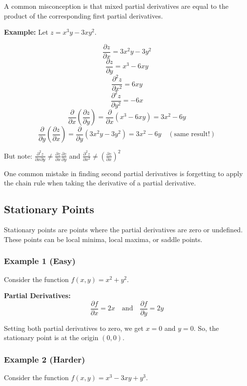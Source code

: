 \documentclass[a4paper,12pt]{article}
\begin{document}
A common misconception is that mixed partial derivatives are equal to the product of the corresponding first partial derivatives.

\textbf{Example:}
Let \( z = x^3y - 3xy^2 \).

\[
\frac{\partial z}{\partial x} = 3x^2y - 3y^2
\]
\[
\frac{\partial z}{\partial y} = x^3 - 6xy
\]
\[
\frac{\partial^2 z}{\partial x^2} = 6xy
\]
\[
\frac{\partial^2 z}{\partial y^2} = -6x
\]
\[
\frac{\partial}{\partial x}\left(\frac{\partial z}{\partial y}\right) = \frac{\partial}{\partial x}(x^3 - 6xy) = 3x^2 - 6y
\]
\[
\frac{\partial}{\partial y}\left(\frac{\partial z}{\partial x}\right) = \frac{\partial}{\partial y}(3x^2y - 3y^2) = 3x^2 - 6y \quad (\text{same result!})
\]

But note: \( \frac{\partial^2 z}{\partial x\partial y} \neq \frac{\partial z}{\partial x}\frac{\partial z}{\partial y} \) and \( \frac{\partial^2 z}{\partial x^2} \neq \left(\frac{\partial z}{\partial x}\right)^2 \) 

One common mistake in finding second partial derivatives is forgetting to apply the chain rule when taking the derivative of a partial derivative.

\subsection*{Stationary Points}

Stationary points are points where the partial derivatives are zero or undefined. These points can be local minima, local maxima, or saddle points.

\subsubsection*{Example 1 (Easy)}

Consider the function \( f(x, y) = x^2 + y^2 \).

\textbf{Partial Derivatives:}
\[
\frac{\partial f}{\partial x} = 2x \quad \text{and} \quad \frac{\partial f}{\partial y} = 2y
\]

Setting both partial derivatives to zero, we get \( x = 0 \) and \( y = 0 \). So, the stationary point is at the origin \( (0, 0) \).

\subsubsection*{Example 2 (Harder)}

Consider the function \( f(x, y) = x^3 - 3xy + y^3 \).
\end{document}
